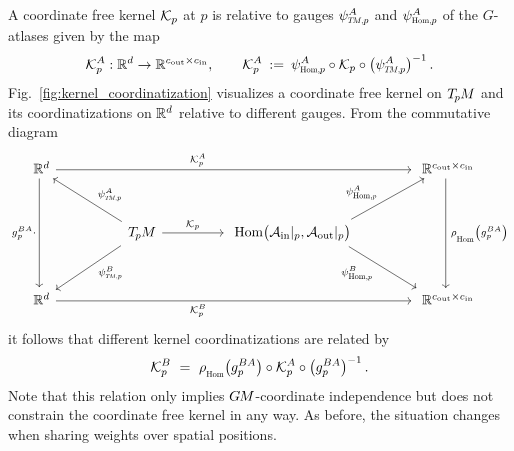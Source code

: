 A coordinate free kernel $\mathcal{K}_p$ at $p$ is relative to gauges $\psiTMp^A$ and $\psiHomp^A$ of the $G$-atlases given by the map
\begin{align}\label{eq:kernel_field_general_coord_expression}
    \Kp^A: \R^d \to \R^{\cout\times\cin}, \qquad
    \Kp^A\: :=\: \psiHomp^A \circ \Kp \circ \big(\psiTMp^A\big)^{-1} \,.
\end{align}
Fig.~\ref{fig:kernel_coordinatization} visualizes a coordinate free kernel on $T_{\mkern-1.5mu p}\mkern-.5muM$ and its coordinatizations on $\mathbb{R}^d$ relative to different gauges.
From the commutative diagram
\begin{equation}
    \begin{tikzcd}[column sep=45pt, row sep=30, font=\normalsize]
        \R^d    \arrow[rrr, pos=.4, "\Kp^A"]
                \arrow[dd, "g_p^{BA}\cdot"']
        & & &[-5pt]
        \R^{\cout\times\cin}
                \arrow[dd, "\,\rhoHom\big(g_p^{BA}\big)"]
        \\
        &
        \TpM    \arrow[r, "\Kp"]
                \arrow[lu, pos=.4, "\psiTMp^A"']
                \arrow[ld, pos=.4, "\psiTMp^B"]
        &
        \Hom\!\big(\Ain|_p,\Aout|_p\big)
                \arrow[ru, start anchor={[xshift=2.em]}, pos=.4, "\psiHomp^A"]
                \arrow[rd, start anchor={[xshift=2.em]}, pos=.4, "\psiHomp^B"']
        &
        \\
        \R^d    \arrow[rrr, pos=.4, "\Kp^B"']
        & & &
        \R^{\cout\times\cin}
    \end{tikzcd}
\end{equation}
it follows that different kernel coordinatizations are related by
\begin{align}\label{eq:kernel_field_unconstrained_gaugetrafo}
    \Kp^B \ =\ \rhoHom\big(g_p^{BA}\big) \circ \Kp^A \circ \big(g_p^{BA}\big)^{-1} \,.
\end{align}
Note that this relation only implies $G\mkern-1.4muM$-coordinate independence but does not constrain the coordinate free kernel in any way.
As before, the situation changes when sharing weights over spatial positions.


